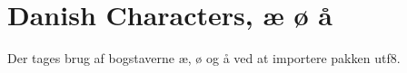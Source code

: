 \section{Danish Characters, æ ø å}
Der tages brug af bogstaverne æ, ø og å ved at importere pakken utf8.